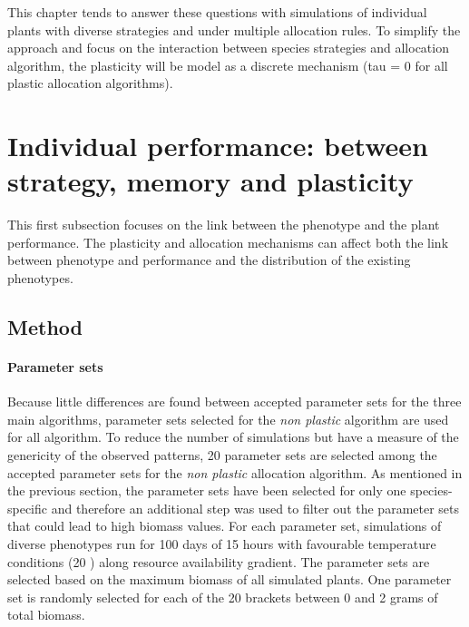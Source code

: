 This chapter tends to answer these questions with simulations of individual plants with diverse strategies and under multiple allocation rules. To simplify the approach and focus on the interaction between species strategies and allocation algorithm, the plasticity will be model as a discrete mechanism (tau = 0 for all plastic allocation algorithms).

\section{Individual performance: between strategy, memory and plasticity}\label{section:landscape}

This first subsection focuses on the link between the phenotype and the plant performance. The plasticity and allocation mechanisms can affect both the link between phenotype and performance and the distribution of the existing phenotypes.



\subsection{Method}

\paragraph{Parameter sets}
Because little differences are found between accepted parameter sets for the three main algorithms, parameter sets selected for the \textit{non plastic} algorithm are used for all algorithm. To reduce the number of simulations but have a measure of the genericity of the observed patterns, 20 parameter sets are selected among the accepted parameter sets for the \textit{non plastic} allocation algorithm. As mentioned in the previous section, the parameter sets have been selected for only one species-specific and therefore an additional step was used to filter out the parameter sets that could lead to high biomass values. For each parameter set, simulations of diverse phenotypes run for 100 days of 15 hours with favourable temperature conditions (20 \celsius) along resource availability gradient. The parameter sets are selected based on the maximum biomass of all simulated plants. One parameter set is randomly selected for each of the 20 brackets between 0 and 2 grams of total biomass.


